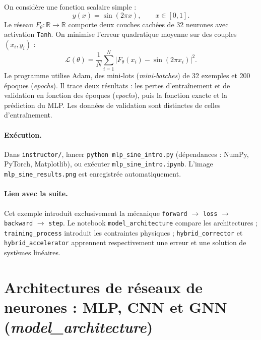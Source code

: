 \documentclass[11pt,a4paper]{article}
\begin{document}
On considère une fonction scalaire simple :
\[y(x)=\sin(2\pi x),\qquad x\in[0,1].\]
Le réseau $F_\theta:\mathbb R\to\mathbb R$ comporte deux couches cachées de 32 neurones avec activation \texttt{Tanh}. On minimise l'erreur quadratique moyenne sur des couples $(x_i,y_i)$ :
\[\mathcal L(\theta)=\frac1N\sum_{i=1}^{N}|F_\theta(x_i)-\sin(2\pi x_i)|^2.\]
Le programme utilise Adam, des mini-lots (\textit{mini-batches}) de 32 exemples et 200 époques (\textit{epochs}). Il trace deux résultats : les pertes d'entraînement et de validation en fonction des époques (\textit{epochs}), puis la fonction exacte et la prédiction du MLP. Les données de validation sont distinctes de celles d'entraînement.
\paragraph{Exécution.} Dans \texttt{instructor/}, lancer \texttt{python mlp\_sine\_intro.py} (dépendances : NumPy, PyTorch, Matplotlib), ou exécuter \texttt{mlp\_sine\_intro.ipynb}. L'image \texttt{mlp\_sine\_results.png} est enregistrée automatiquement.
\paragraph{Lien avec la suite.} Cet exemple introduit exclusivement la mécanique \texttt{forward} $\rightarrow$ \texttt{loss} $\rightarrow$ \texttt{backward} $\rightarrow$ \texttt{step}. Le notebook \texttt{model\_architecture} compare les architectures ; \texttt{training\_process} introduit les contraintes physiques ; \texttt{hybrid\_corrector} et \texttt{hybrid\_accelerator} apprennent respectivement une erreur et une solution de systèmes linéaires.

\section{Architectures de réseaux de neurones : MLP, CNN et GNN (\textit{model\_architecture})}
\end{document}
